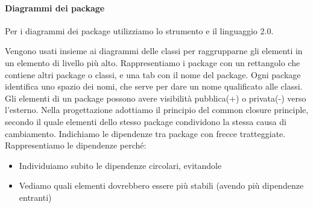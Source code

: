 
        \paragraph{Diagrammi dei package}\label{PP:Sviluppo:DiagrammiPackage}
        Per i diagrammi dei package utilizziamo lo strumento  e il linguaggio  2.0.\par
        Vengono usati insieme ai diagrammi delle classi per raggrupparne gli elementi in un elemento di livello più alto.
        Rappresentiamo i package con un rettangolo che contiene altri package o classi, e una tab con il nome del package.
        Ogni package identifica uno spazio dei nomi, che serve per dare un nome qualificato alle classi.
        Gli elementi di un package possono avere visibilità pubblica(+) o privata(-) verso l'esterno.
		Nella progettazione adottiamo il principio del common closure principle, secondo il quale elementi dello stesso
		package condividono la stessa causa di cambiamento.
        Indichiamo le dipendenze tra package con frecce tratteggiate.
        Rappresentiamo le dipendenze perché:
        \begin{itemize}
            \item Individuiamo subito le dipendenze circolari, evitandole
            \item Vediamo quali elementi dovrebbero essere più stabili (avendo più dipendenze entranti)
        \end{itemize}


